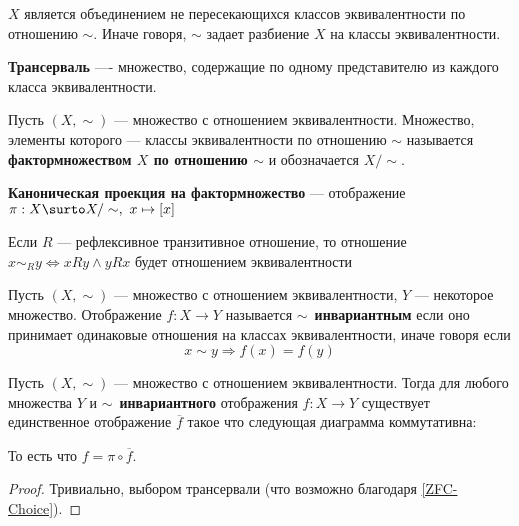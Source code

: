 \documentclass{article}
\begin{document}
    \begin{corollary}
        \label{rem:quotient-set-partition}
        \(X\) является объединением не пересекающихся классов эквивалентности по отношению \(\sim\). Иначе говоря, \(\sim\) задает разбиение \(X\) на классы эквивалентности. 
    \end{corollary}
    
    \begin{definition}
        \label{def:transerval}
        \textbf{Трансерваль} ---- множество, содержащие по одному представителю из каждого класса эквивалентности. 
    \end{definition}
    
    \begin{definition}
        \label{def:quotient-set}
        Пусть \((X, \sim)\) --- множество с отношением эквивалентности. Множество, элементы которого --- классы эквивалентности по отношению \(\sim\) называется \textbf{фактормножеством \(X\) по отношению \(\sim\)} и обозначается \(X / \sim\). 
    \end{definition}
    
    \begin{definition}
        \label{def:qutioent-set-canonical-map}
        \textbf{Каноническая проекция на фактормножество} --- отображение \\ \(\pi: X \surto X / \sim,\  x \mapsto [x]\)
    \end{definition}
    
    Если \(R\) --- рефлексивное транзитивное отношение, то отношение \(x \sim_R y \Leftrightarrow xRy \land yRx\) будет отношением эквивалентности 
    
    \begin{definition}
        Пусть \((X, \sim)\) --- множество с отношением эквивалентности, \(Y\) --- некоторое множество. Отображение \(f \colon X \to Y\) называется \(\sim\)~\textbf{инвариантным} если оно принимает одинаковые отношения на классах эквивалентности, иначе говоря если 
        \[
        x \sim y \Rightarrow f(x) = f(y)
        \]
    \end{definition}
    \begin{proposition}
    Пусть \((X, \sim)\) --- множество с отношением эквивалентности. Тогда для любого множества \(Y\) и \(\sim\)~\textbf{инвариантного} отображения  \(f \colon X \to Y\) существует единственное отображение $\overline{f}$ такое что следующая диаграмма коммутативна:
        \begin{center}
        \end{center}
        То есть что \(f = \pi \circ \overline{f}\).
    \end{proposition}
    \begin{proof}
        Тривиально, выбором трансервали (что возможно благодаря \ref{ZFC-Choice}).
    \end{proof}
    
\end{document}
